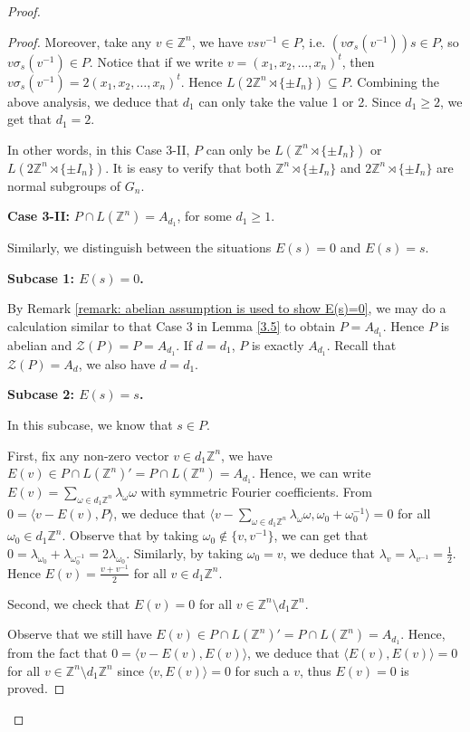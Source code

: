\documentclass[12pt]{amsart}
\theoremstyle{definition}
\theoremstyle{remark}
\begin{document}
\begin{proof}
\begin{proof}
Moreover, take any $v\in\mathbb{Z}^n$, we have $vsv^{-1}\in P$, i.e. $(v\sigma_s(v^{-1}))s\in P$, so $v\sigma_s(v^{-1})\in P$. Notice that if we write $v=(x_{1},x_{2},\dots,x_{n} )^t$, then $v\sigma_s(v^{-1})=2(x_1,x_2,\dots,x_n)^t$. Hence $L(2\mathbb{Z}^n\rtimes \{\pm I_{n}\})\subseteq P$. Combining the above analysis, we deduce that $d_{1}$ can only take the value 1 or 2. Since $d_1\geq 2$, we get that $d_1=2$. 

In other words, in this Case 3-II, $P$ can only be $L(\mathbb{Z}^n \rtimes \{\pm I_{n}\})$ or $L(2\mathbb{Z}^n \rtimes \{\pm I_{n}\})$. It is easy to verify that both $\mathbb{Z}^n \rtimes \{\pm I_{n}\}$ and $2\mathbb{Z}^n \rtimes \{\pm I_{n}\}$ are normal subgroups of $G_{n}$.


\textbf{Case 3-II:} $P\cap L(\mathbb{Z}^n)=A_{d_{1}}$, for some $d_1\ge 1$.

Similarly, we distinguish between the situations $E(s)=0$ and $E(s)=s$.

\textbf{Subcase 1: $E(s) = 0$.}

By Remark \ref{remark: abelian assumption is used to show E(s)=0}, we may do a calculation similar to that Case 3 in Lemma \ref{3.5} to obtain $P = A_{d_{1}}$. Hence $P$ is abelian and $\mathcal{Z}(P) = P =A_{d_{1}}$. If $d=d_{1}$, $P$ is exactly $A_{d_{1}}$. Recall that $\mathcal{Z}(P) = A_{d}$, we also have $d=d_1$.

\textbf{Subcase 2: $E(s) = s$.}

In this subcase, we know that $s\in P$.

First, fix any non-zero vector $v\in d_1\mathbb{Z}^n$, we have $E(v)\in P\cap L(\mathbb{Z}^n)'=P\cap L(\mathbb{Z}^n)=A_{d_1}$. Hence, we can write $E(v)=\sum\limits_{\omega\in d_1\mathbb{Z}^n}\lambda_{\omega}\omega$ with symmetric Fourier coefficients. From $0=\langle v-E(v), P \rangle$, we deduce that $\langle v-\sum\limits_{\omega\in d_1\mathbb{Z}^n}\lambda_{\omega}\omega, \omega_0+\omega_{0}^{-1} \rangle=0$ for all $\omega_0\in d_1\mathbb{Z}^n$. Observe that by taking $\omega_0\not\in\{v, v^{-1}\}$, we can get that $0=\lambda_{\omega_0}+\lambda_{\omega_0^{-1}}=2\lambda_{\omega_0}.$ Similarly, by taking $\omega_0=v$, we deduce that $\lambda_{v}=\lambda_{v^{-1}}=\frac{1}{2}$. Hence $E(v)=\frac{v+v^{-1}}{2}$ for all $v\in d_1\mathbb{Z}^n$.

Second, we check that $E(v)=0$ for all $v\in\mathbb{Z}^n\setminus {d_1\mathbb{Z}^n}$.

Observe that we still have $E(v)\in P\cap L(\mathbb{Z}^n)'=P\cap L(\mathbb{Z}^n)=A_{d_{1}}$. Hence, from the fact that $0=\langle v-E(v), E(v) \rangle$, we deduce that $\langle E(v), E(v)\rangle=0$ for all $v\in \mathbb{Z}^n\setminus {d_1\mathbb{Z}^n}$ since $\langle v, E(v) \rangle=0$ for such a $v$, thus $E(v)=0$ is proved.


\end{proof}
\end{proof}
\end{document}
